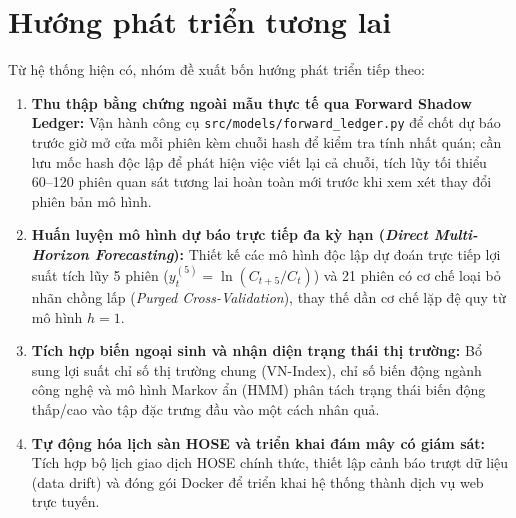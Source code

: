 \documentclass[12pt,a4paper]{report}
\begin{document}
\section{Hướng phát triển tương lai}
Từ hệ thống hiện có, nhóm đề xuất bốn hướng phát triển tiếp theo:
\begin{enumerate}
    \item \textbf{Thu thập bằng chứng ngoài mẫu thực tế qua Forward Shadow Ledger:} Vận hành công cụ \nolinkurl{src/models/forward_ledger.py} để chốt dự báo trước giờ mở cửa mỗi phiên kèm chuỗi hash để kiểm tra tính nhất quán; cần lưu mốc hash độc lập để phát hiện việc viết lại cả chuỗi, tích lũy tối thiểu 60--120 phiên quan sát tương lai hoàn toàn mới trước khi xem xét thay đổi phiên bản mô hình.
    \item \textbf{Huấn luyện mô hình dự báo trực tiếp đa kỳ hạn (\textit{Direct Multi-Horizon Forecasting}):} Thiết kế các mô hình độc lập dự đoán trực tiếp lợi suất tích lũy 5 phiên ($y_t^{(5)} = \ln(C_{t+5}/C_t)$) và 21 phiên có cơ chế loại bỏ nhãn chồng lấp (\textit{Purged Cross-Validation}), thay thế dần cơ chế lặp đệ quy từ mô hình $h=1$.
    \item \textbf{Tích hợp biến ngoại sinh và nhận diện trạng thái thị trường:} Bổ sung lợi suất chỉ số thị trường chung (VN-Index), chỉ số biến động ngành công nghệ và mô hình Markov ẩn (HMM) phân tách trạng thái biến động thấp/cao vào tập đặc trưng đầu vào một cách nhân quả.
    \item \textbf{Tự động hóa lịch sàn HOSE và triển khai đám mây có giám sát:} Tích hợp bộ lịch giao dịch HOSE chính thức, thiết lập cảnh báo trượt dữ liệu (data drift) và đóng gói Docker để triển khai hệ thống thành dịch vụ web trực tuyến.
\end{enumerate}
\end{document}
